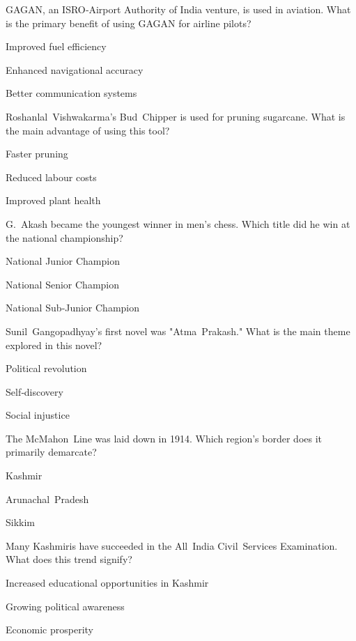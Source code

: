 \begin{enhancedmcq}{GAGAN, an ISRO‑Airport Authority of India venture, is used in aviation. What is the primary benefit of using GAGAN for airline pilots?}
\item Improved fuel efficiency
\item Enhanced navigational accuracy
\item Better communication systems

\end{enhancedmcq}
\begin{enhancedmcq}{Roshanlal Vishwakarma's Bud Chipper is used for pruning sugarcane. What is the main advantage of using this tool?}
\item Faster pruning
\item Reduced labour costs
\item Improved plant health

\end{enhancedmcq}
\begin{enhancedmcq}{G. Akash became the youngest winner in men's chess. Which title did he win at the national championship?}
\item National Junior Champion
\item National Senior Champion
\item National Sub‑Junior Champion

\end{enhancedmcq}
\begin{enhancedmcq}{Sunil Gangopadhyay's first novel was "Atma Prakash." What is the main theme explored in this novel?}
\item Political revolution
\item Self‑discovery
\item Social injustice

\end{enhancedmcq}
\begin{enhancedmcq}{The McMahon Line was laid down in 1914. Which region's border does it primarily demarcate?}
\item Kashmir
\item Arunachal Pradesh
\item Sikkim

\end{enhancedmcq}
\begin{enhancedmcq}{Many Kashmiris have succeeded in the All India Civil Services Examination. What does this trend signify?}
\item Increased educational opportunities in Kashmir
\item Growing political awareness
\item Economic prosperity

\end{enhancedmcq}
